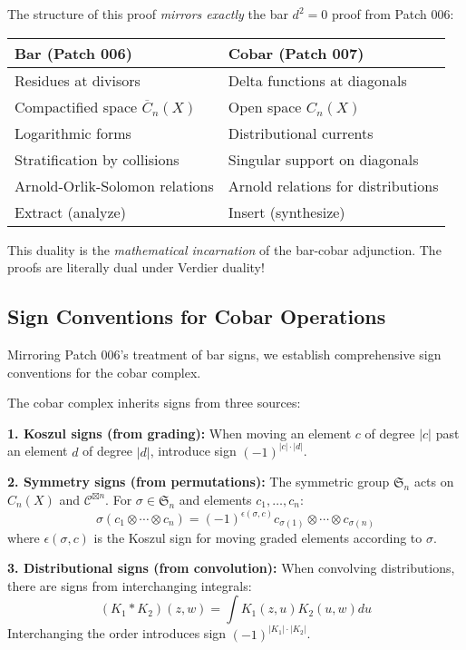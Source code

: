 \begin{remark}[Duality with Bar $d^2=0$ Proof]\label{rem:bar-cobar-d2-duality}
The structure of this proof \emph{mirrors exactly} the bar $d^2=0$ proof from 
Patch 006:

\begin{center}
\begin{tabular}{l|l}
\textbf{Bar (Patch 006)} & \textbf{Cobar (Patch 007)} \\ \hline
Residues at divisors & Delta functions at diagonals \\
Compactified space $\overline{C}_n(X)$ & Open space $C_n(X)$ \\
Logarithmic forms & Distributional currents \\
Stratification by collisions & Singular support on diagonals \\
Arnold-Orlik-Solomon relations & Arnold relations for distributions \\
Extract (analyze) & Insert (synthesize) \\
\end{tabular}
\end{center}

This duality is the \emph{mathematical incarnation} of the bar-cobar adjunction. 
The proofs are literally dual under Verdier duality!
\end{remark}

\subsection{Sign Conventions for Cobar Operations}

Mirroring Patch 006's treatment of bar signs, we establish comprehensive sign 
conventions for the cobar complex.

\begin{convention}\label{conv:cobar-signs}
The cobar complex inherits signs from three sources:

\textbf{1. Koszul signs (from grading):}
When moving an element $c$ of degree $|c|$ past an element $d$ of degree $|d|$, 
introduce sign $(-1)^{|c| \cdot |d|}$.

\textbf{2. Symmetry signs (from permutations):}
The symmetric group $\mathfrak{S}_n$ acts on $C_n(X)$ and $\mathcal{C}^{\boxtimes n}$. 
For $\sigma \in \mathfrak{S}_n$ and elements $c_1, \ldots, c_n$:
$$\sigma(c_1 \otimes \cdots \otimes c_n) = (-1)^{\epsilon(\sigma, c)} 
c_{\sigma(1)} \otimes \cdots \otimes c_{\sigma(n)}$$
where $\epsilon(\sigma, c)$ is the Koszul sign for moving graded elements according 
to $\sigma$.

\textbf{3. Distributional signs (from convolution):}
When convolving distributions, there are signs from interchanging integrals:
$$(K_1 * K_2)(z, w) = \int K_1(z, u) K_2(u, w) du$$
Interchanging the order introduces sign $(-1)^{|K_1| \cdot |K_2|}$.
\end{convention}

